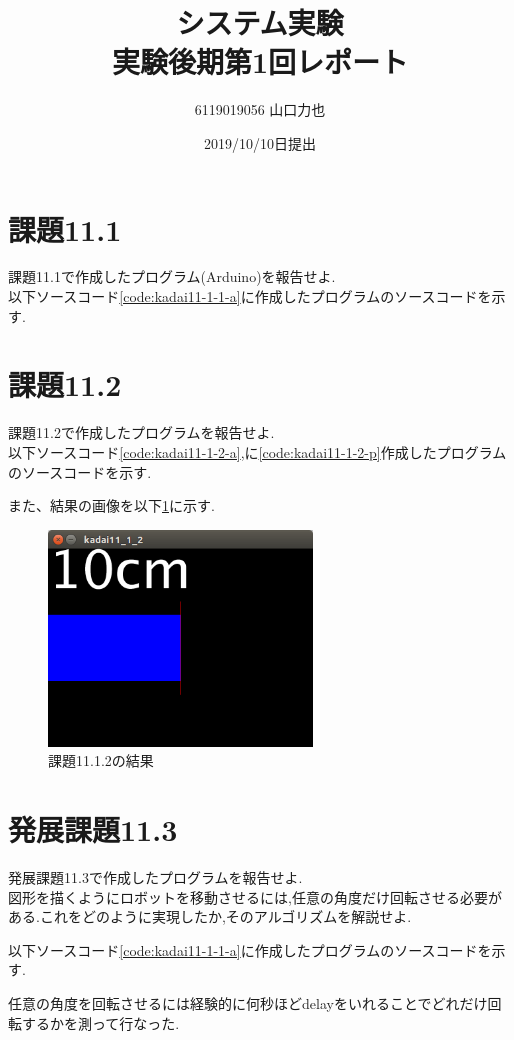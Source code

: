 \documentclass{jarticle}
\title{{システム実験}\\実験後期第1回レポート}
\author{6119019056 山口力也}
\date{2019/10/10日提出}
\begin{document}
\maketitle
\section{課題11.1}
課題11.1で作成したプログラム(Arduino)を報告せよ. \\
以下ソースコード\ref{code:kadai11-1-1-a}に作成したプログラムのソースコードを示す.



\section{課題11.2}
課題11.2で作成したプログラムを報告せよ. \\
以下ソースコード\ref{code:kadai11-1-2-a},に\ref{code:kadai11-1-2-p}作成したプログラムのソースコードを示す.




また、結果の画像を以下\ref{fig:kadai11-1-2}に示す.
\begin{figure}[H]
\begin{center}
\includegraphics[width=7.0cm]{figures/kadai11-1-2.png}
\caption{課題11.1.2の結果}
\label{fig:kadai11-1-2}
\end{center}
\end{figure}
\section{発展課題11.3}
発展課題11.3で作成したプログラムを報告せよ. \\
図形を描くようにロボットを移動させるには,任意の角度だけ回転させる必要がある.これをどのように実現したか,そのアルゴリズムを解説せよ.

以下ソースコード\ref{code:kadai11-1-1-a}に作成したプログラムのソースコードを示す.



任意の角度を回転させるには経験的に何秒ほどdelayをいれることでどれだけ回転するかを測って行なった.
\end{document}
